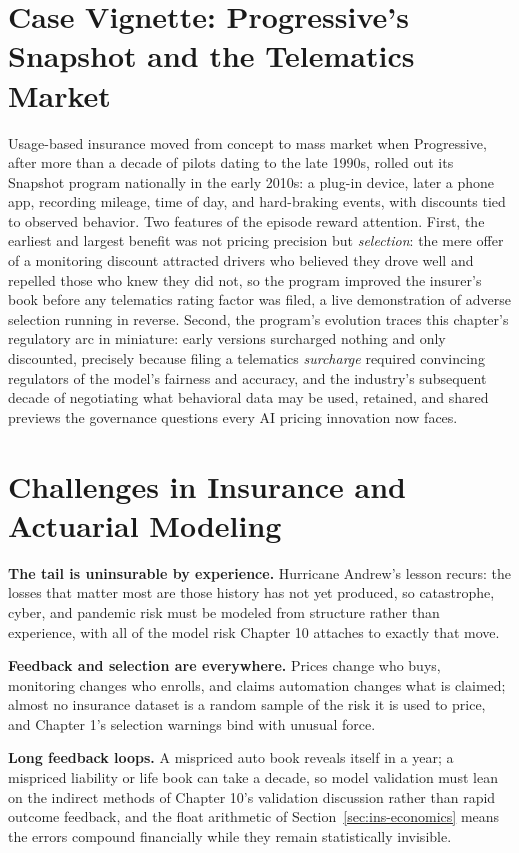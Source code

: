\documentclass[../ai_in_finance]{subfiles}
\begin{document}
\section{Case Vignette: Progressive's Snapshot and the Telematics Market}
\label{sec:ins-vignette}

Usage-based insurance moved from concept to mass market when Progressive, after more than a decade of pilots dating to the late 1990s, rolled out its Snapshot program nationally in the early 2010s: a plug-in device, later a phone app, recording mileage, time of day, and hard-braking events, with discounts tied to observed behavior. Two features of the episode reward attention. First, the earliest and largest benefit was not pricing precision but \emph{selection}: the mere offer of a monitoring discount attracted drivers who believed they drove well and repelled those who knew they did not, so the program improved the insurer's book before any telematics rating factor was filed, a live demonstration of adverse selection running in reverse. Second, the program's evolution traces this chapter's regulatory arc in miniature: early versions surcharged nothing and only discounted, precisely because filing a telematics \emph{surcharge} required convincing regulators of the model's fairness and accuracy, and the industry's subsequent decade of negotiating what behavioral data may be used, retained, and shared previews the governance questions every AI pricing innovation now faces.

\section{Challenges in Insurance and Actuarial Modeling}

\textbf{The tail is uninsurable by experience.} Hurricane Andrew's lesson recurs: the losses that matter most are those history has not yet produced, so catastrophe, cyber, and pandemic risk must be modeled from structure rather than experience, with all of the model risk Chapter 10 attaches to exactly that move.

\textbf{Feedback and selection are everywhere.} Prices change who buys, monitoring changes who enrolls, and claims automation changes what is claimed; almost no insurance dataset is a random sample of the risk it is used to price, and Chapter 1's selection warnings bind with unusual force.

\textbf{Long feedback loops.} A mispriced auto book reveals itself in a year; a mispriced liability or life book can take a decade, so model validation must lean on the indirect methods of Chapter 10's validation discussion rather than rapid outcome feedback, and the float arithmetic of Section~\ref{sec:ins-economics} means the errors compound financially while they remain statistically invisible.
\end{document}
